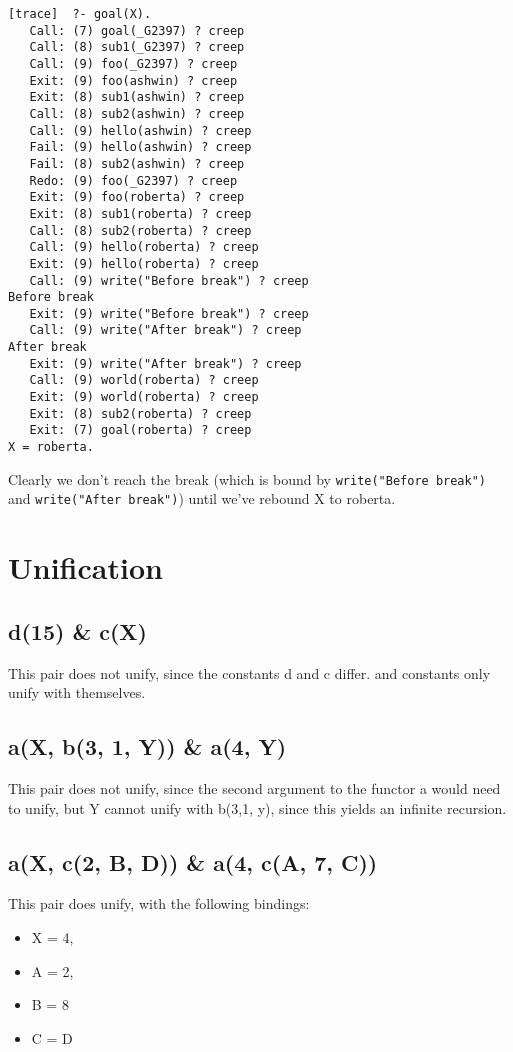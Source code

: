 \documentclass[paper=a4, fontsize=11pt]{scrartcl} %
\numberwithin{equation}{section} %
\numberwithin{figure}{section} %
\numberwithin{table}{section} %
\begin{document}
\begin{lstlisting}
[trace]  ?- goal(X).
   Call: (7) goal(_G2397) ? creep
   Call: (8) sub1(_G2397) ? creep
   Call: (9) foo(_G2397) ? creep
   Exit: (9) foo(ashwin) ? creep
   Exit: (8) sub1(ashwin) ? creep
   Call: (8) sub2(ashwin) ? creep
   Call: (9) hello(ashwin) ? creep
   Fail: (9) hello(ashwin) ? creep
   Fail: (8) sub2(ashwin) ? creep
   Redo: (9) foo(_G2397) ? creep
   Exit: (9) foo(roberta) ? creep
   Exit: (8) sub1(roberta) ? creep
   Call: (8) sub2(roberta) ? creep
   Call: (9) hello(roberta) ? creep
   Exit: (9) hello(roberta) ? creep
   Call: (9) write("Before break") ? creep
Before break
   Exit: (9) write("Before break") ? creep
   Call: (9) write("After break") ? creep
After break
   Exit: (9) write("After break") ? creep
   Call: (9) world(roberta) ? creep
   Exit: (9) world(roberta) ? creep
   Exit: (8) sub2(roberta) ? creep
   Exit: (7) goal(roberta) ? creep
X = roberta.
\end{lstlisting}

Clearly we don't reach the break (which is bound by \texttt{write("Before break")} and \texttt{write("After break")}) until we've rebound X to roberta. 

\section{Unification}

\subsection{d(15) \& c(X)}

This pair does not unify, since the constants d and c differ. and constants only unify with themselves.

\subsection{a(X, b(3, 1, Y)) \& a(4, Y)}

This pair does not unify, since the second argument to the functor a would need to unify, but Y cannot unify with b(3,1, y), since this yields an infinite recursion.

\subsection{a(X, c(2, B, D)) \& a(4, c(A, 7, C))}

This pair does unify, with the following bindings:
\begin{itemize}
\item X = 4,
\item A = 2,
\item B = 8
\item C = D
\end{itemize}
\end{document}

